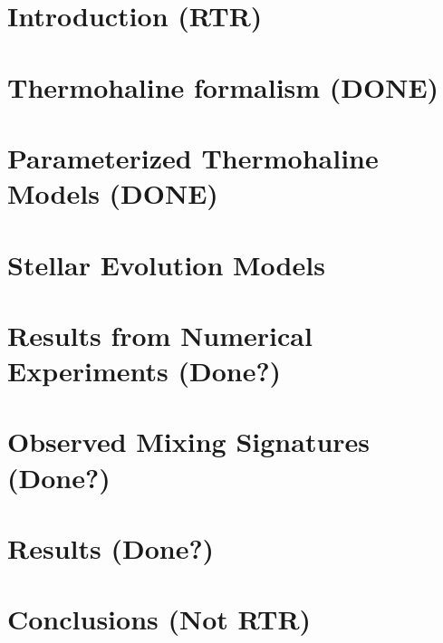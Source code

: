 \documentclass[linenumbers,twocolumn]{aastex62}
\begin{document}

\section{Introduction \textbf{(RTR)} }
\label{sec:intro}
\setcounter{footnote}{0}


\section{Thermohaline formalism \textbf{(DONE)}}
\label{sec:formalism}


\section{Parameterized Thermohaline Models \textbf{(DONE)}}
\label{sec:parameterizations}


\section{Stellar Evolution Models} %
\label{sec:mesa_experiment}


\section{Results from Numerical Experiments \textbf{(Done?)}}
\label{sec:mesa_results}


\section{Observed Mixing Signatures \bf({Done?})}
\label{sec:obs}


\section{Results \bf{(Done?)}} 
\label{sec:punchline}


\section{Conclusions \textbf{(Not RTR)}}
\label{sec:conclusions}

\end{document}

